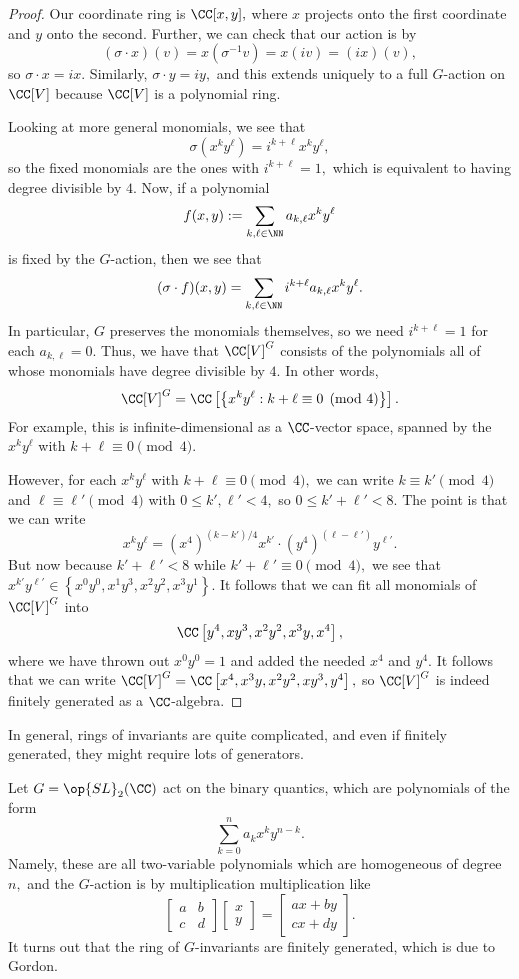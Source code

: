 \documentclass[../notes.tex]{subfiles}
\begin{document}
\begin{proof}
	Our coordinate ring is $\CC[x,y],$ where $x$ projects onto the first coordinate and $y$ onto the second. Further, we can check that our action is by
	\[(\sigma\cdot x)(v)=x(\sigma^{-1}v)=x(iv)=(ix)(v),\]
	so $\sigma\cdot x=ix.$ Similarly, $\sigma\cdot y=iy,$ and this extends uniquely to a full $G$-action on $\CC[V]$ because $\CC[V]$ is a polynomial ring.
	
	Looking at more general monomials, we see that
	\[\sigma\left(x^ky^\ell\right)=i^{k+\ell}x^ky^\ell,\]
	so the fixed monomials are the ones with $i^{k+\ell}=1,$ which is equivalent to having degree divisible by $4.$ Now, if a polynomial
	\[f(x,y):=\sum_{k,\ell\in\NN}a_{k,\ell}x^ky^\ell\]
	is fixed by the $G$-action, then we see that
	\[(\sigma\cdot f)(x,y)=\sum_{k,\ell\in\NN}i^{k+\ell}a_{k,\ell}x^ky^\ell.\]
	In particular, $G$ preserves the monomials themselves, so we need $i^{k+\ell}=1$ for each $a_{k,\ell}=0.$ Thus, we have that $\CC[V]^G$ consists of the polynomials all of whose monomials have degree divisible by $4.$ In other words,
	\[\CC[V]^G=\CC\left[\left\{x^ky^\ell:k+\ell\equiv0\pmod4\right\}\right].\]
	For example, this is infinite-dimensional as a $\CC$-vector space, spanned by the $x^ky^\ell$ with $k+\ell\equiv0\pmod4.$
	
	However, for each $x^ky^\ell$ with $k+\ell\equiv0\pmod4,$ we can write $k\equiv k'\pmod4$ and $\ell\equiv\ell'\pmod4$ with $0\le k',\ell'<4,$ so $0\le k'+\ell'<8.$ The point is that we can write
	\[x^ky^\ell=\left(x^4\right)^{(k-k')/4}x^{k'}\cdot\left(y^4\right)^{(\ell-\ell')}y^{\ell'}.\]
	But now because $k'+\ell'<8$ while $k'+\ell'\equiv0\pmod4,$ we see that $x^{k'}y^{\ell'}\in\left\{x^0y^0,x^1y^3,x^2y^2,x^3y^1\right\}.$ It follows that we can fit all monomials of $\CC[V]^G$ into
	\[\CC\left[y^4,xy^3,x^2y^2,x^3y,x^4\right],\]
	where we have thrown out $x^0y^0=1$ and added the needed $x^4$ and $y^4.$ It follows that we can write $\CC[V]^G=\CC\left[x^4,x^3y,x^2y^2,xy^3,y^4\right],$ so $\CC[V]^G$ is indeed finitely generated as a $\CC$-algebra.
\end{proof}
In general, rings of invariants are quite complicated, and even if finitely generated, they might require lots of generators.
\begin{ex}
	Let $G=\op{SL}_2(\CC)$ act on the binary quantics, which are polynomials of the form
	\[\sum_{k=0}^na_kx^ky^{n-k}.\]
	Namely, these are all two-variable polynomials which are homogeneous of degree $n,$ and the $G$-action is by multiplication multiplication like
	\[\begin{bmatrix}
		a & b \\
		c & d
	\end{bmatrix}\begin{bmatrix}
		x \\ y
	\end{bmatrix}=\begin{bmatrix}
		ax+by \\
		cx+dy
	\end{bmatrix}.\]
	It turns out that the ring of $G$-invariants are finitely generated, which is due to Gordon.
\end{ex}
\end{document}
